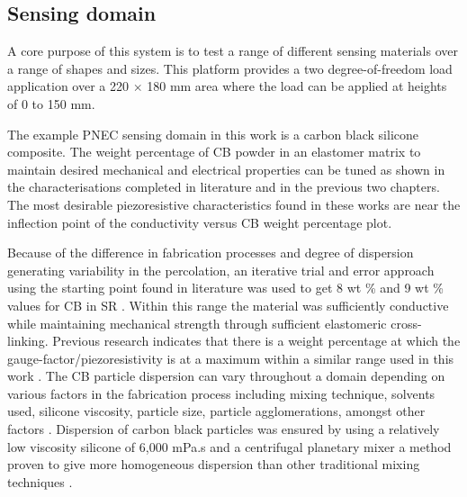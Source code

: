 


\subsection{Sensing domain}
A core purpose of this system is to test a range of different sensing materials over a range of shapes and sizes. This platform provides a two degree-of-freedom load application over a 220 $\times$ 180 mm area where the load can be applied at heights of 0 to 150 mm.

The example PNEC sensing domain in this work is a carbon black silicone composite. The weight percentage of CB powder in an elastomer matrix to maintain desired mechanical and electrical properties can be tuned as shown in the characterisations completed in literature \cite{D'Asaro2017, Shang2016} and in the previous two chapters. The most desirable piezoresistive characteristics found in these works are near the inflection point of the conductivity versus CB weight percentage plot.

Because of the difference in fabrication processes and degree of dispersion generating variability in the percolation, an iterative trial and error approach using the starting point found in literature was used to get 8 wt \% and 9 wt \% values for CB in SR \cite{D'Asaro2017, Shang2016}. Within this range the material was sufficiently conductive while maintaining mechanical strength through sufficient elastomeric cross-linking. Previous research indicates that there is a weight percentage at which the gauge-factor/piezoresistivity is at a maximum within a similar range used in this work \cite{Dong2017, Yang2020}. The CB particle dispersion can vary throughout a domain depending on various factors in the fabrication process including mixing technique, solvents used, silicone viscosity, particle size, particle agglomerations, amongst other factors \cite{Kalyon2002,Rodgers2010,Lux1993,Xu2016}. Dispersion of carbon black particles was ensured by using a relatively low viscosity silicone of 6,000 mPa.s and a centrifugal planetary mixer a method proven to give more homogeneous dispersion than other traditional mixing techniques \cite{Thinky2010}.



